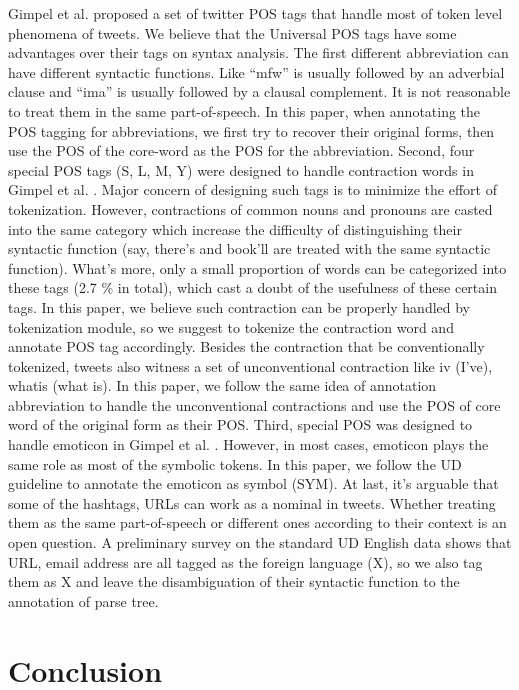 \documentclass[11pt,letterpaper]{article}
\begin{document}
Gimpel et al.  proposed a set of twitter POS tags that handle most of token level phenomena of tweets. 
We believe that the Universal POS tags have some advantages over their tags on syntax analysis.
The first different abbreviation can have different syntactic functions. 
Like “mfw” is usually followed by an adverbial clause and “ima” is usually followed by a clausal complement. 
It is not reasonable to treat them in the same part-of-speech. 
In this paper, when annotating the POS tagging for abbreviations, we first try to recover their original forms, then use the POS of the core-word as the POS for the abbreviation.
Second, four special POS tags (S, L, M, Y) were designed to handle contraction words in Gimpel et al. . Major concern of designing such tags is to minimize the effort of tokenization. 
However, contractions of common nouns and pronouns are casted into the same category which increase the difficulty of distinguishing their syntactic function (say, there's and book'll are treated with the same syntactic function). What's more, only a small proportion of words can be categorized into these tags (2.7 \% in total), which cast a doubt of the usefulness of these certain tags. In this paper, we believe such contraction can be properly handled by tokenization module, so we suggest to tokenize the contraction word and annotate POS tag accordingly.
Besides the contraction that be conventionally tokenized, tweets also witness a set of unconventional contraction like iv (I've), whatis (what is). In this paper, we follow the same idea of annotation abbreviation to handle the unconventional contractions and use the POS of core word of the original form as their POS.
Third, special POS was designed to handle emoticon in Gimpel et al. . However, in most cases, emoticon plays the same role as most of the symbolic tokens. In this paper, we follow the UD guideline to annotate the emoticon as symbol (SYM).
At last, it’s arguable that some of the hashtags, URLs can work as a nominal in tweets. Whether treating them as the same part-of-speech or different ones according to their context is an open question. A preliminary survey on the standard UD English data shows that URL, email address are all tagged as the foreign language (X), so we also tag them as X and leave the disambiguation of their syntactic function to the annotation of parse tree.


\section{Conclusion}





\end{document}
